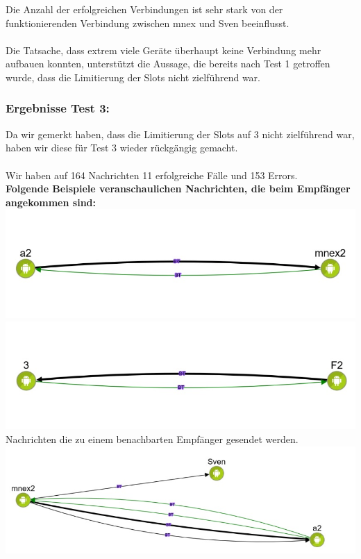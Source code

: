 Die Anzahl der erfolgreichen Verbindungen ist sehr stark von der
funktionierenden Verbindung zwischen mnex und Sven beeinflusst.\\\\

Die Tatsache, dass extrem viele Geräte überhaupt keine Verbindung mehr
aufbauen konnten, unterstützt die Aussage, die bereits nach Test 1
getroffen wurde, dass die Limitierung der Slots nicht zielführend war.

\subsubsection{Ergebnisse Test 3:}\label{ergebnisse-test-3}

Da wir gemerkt haben, dass die Limitierung der Slots auf 3 nicht
zielführend war, haben wir diese für Test 3 wieder rückgängig gemacht.\\\\

Wir haben auf 164 Nachrichten 11 erfolgreiche Fälle und 153 Errors.
\\
\textbf{Folgende Beispiele veranschaulichen Nachrichten, die beim
Empfänger angekommen sind:}\\
\includegraphics[width=1.0\textwidth]{belege/grosstests/Bilder/Grosstest2/Test3Erfolg1.jpg}\\
\includegraphics[width=1.0\textwidth]{belege/grosstests/Bilder/Grosstest2/Test3Erfolg2.jpg}\\
Nachrichten die zu einem benachbarten Empfänger gesendet werden.\\
\includegraphics[width=1.0\textwidth]{belege/grosstests/Bilder/Grosstest2/Test3Erfolg3.jpg}\\

